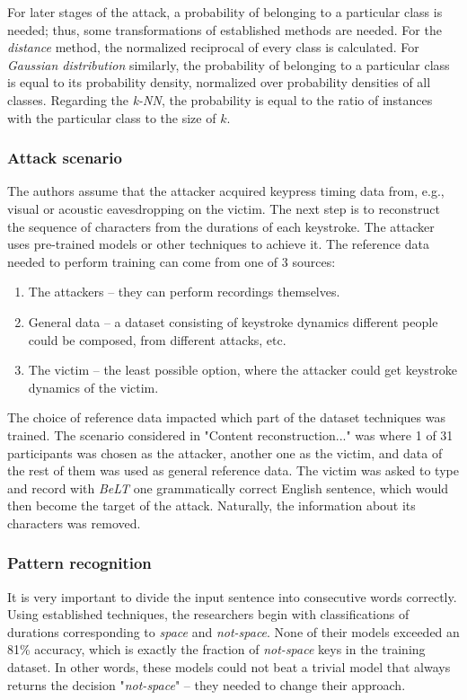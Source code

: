 \documentclass[../main.tex]{subfiles}
\begin{document}
For later stages of the attack, a probability of belonging to a particular class is needed; thus, some transformations of established methods are needed. For the \textit{distance} method, the normalized reciprocal of every class is calculated. For \textit{Gaussian distribution} similarly, the probability of belonging to a particular class is equal to its probability density, normalized over probability densities of all classes. Regarding the \textit{k-NN}, the probability is equal to the ratio of instances with the particular class to the size of $k$. %

\subsubsection{Attack scenario}
\label{subsubsec:dynamics_attack_scenario}
The authors assume that the attacker acquired keypress timing data from, e.g., visual or acoustic eavesdropping on the victim. The next step is to reconstruct the sequence of characters from the durations of each keystroke. The attacker uses pre-trained models or other techniques to achieve it. The reference data needed to perform training can come from one of 3 sources:
\begin{enumerate}
    \item The attackers -- they can perform recordings themselves.
    \item General data -- a dataset consisting of keystroke dynamics different people could be composed, from different attacks, etc.
    \item The victim -- the least possible option, where the attacker could get keystroke dynamics of the victim.
\end{enumerate}
The choice of reference data impacted which part of the dataset techniques was trained.
The scenario considered in "Content reconstruction..." was where 1 of 31 participants was chosen as the attacker, another one as the victim, and data of the rest of them was used as general reference data. The victim was asked to type and record with \textit{BeLT} one grammatically correct English sentence, which would then become the target of the attack. Naturally, the information about its characters was removed.

\subsubsection{Pattern recognition}
It is very important to divide the input sentence into consecutive words correctly. Using established techniques, the researchers begin with classifications of durations corresponding to \textit{space} and \textit{not-space}. None of their models exceeded an 81\% accuracy, which is exactly the fraction of \textit{not-space} keys in the training dataset. In other words, these models could not beat a trivial model that always returns the decision "\textit{not-space}" -- they needed to change their approach.
\end{document}
